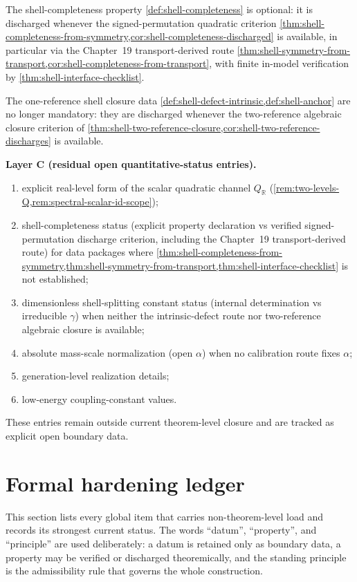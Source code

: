 The shell-completeness property \cref{def:shell-completeness} is optional:
it is discharged whenever the signed-permutation quadratic criterion
\cref{thm:shell-completeness-from-symmetry,cor:shell-completeness-discharged}
is available, in particular via the Chapter~19 transport-derived route
\cref{thm:shell-symmetry-from-transport,cor:shell-completeness-from-transport},
with finite in-model verification by
\cref{thm:shell-interface-checklist}.

The one-reference shell closure data
\cref{def:shell-defect-intrinsic,def:shell-anchor} are no longer mandatory:
they are discharged whenever the two-reference algebraic closure criterion
of \cref{thm:shell-two-reference-closure,cor:shell-two-reference-discharges}
is available.

\textbf{Layer C (residual open quantitative-status entries).}
\begin{enumerate}[label=\textup{(\roman*)}]
\item
  explicit real-level form of the scalar quadratic channel
  \(Q_{\mathbb R}\)
  (\cref{rem:two-levels-Q,rem:spectral-scalar-id-scope});
\item
  shell-completeness status (explicit property declaration vs verified
  signed-permutation discharge criterion, including the Chapter~19
  transport-derived route) for data packages where
  \cref{thm:shell-completeness-from-symmetry,thm:shell-symmetry-from-transport,thm:shell-interface-checklist}
  is not established;
\item
  dimensionless shell-splitting constant status
  (internal determination vs irreducible \(\gamma\)) when neither the
  intrinsic-defect route nor two-reference algebraic closure is available;
\item
  absolute mass-scale normalization (open \(\alpha\)) when no calibration
  route fixes \(\alpha\);
\item
  generation-level realization details;
\item
  low-energy coupling-constant values.
\end{enumerate}

These entries remain outside current theorem-level closure and are tracked as
explicit open boundary data.

\section{Formal hardening ledger}
\label{sec:cond-hardening-ledger}

This section lists every global item that carries non-theorem-level load and
records its strongest current status.
The words ``datum'', ``property'', and ``principle'' are used deliberately:
a datum is retained only as boundary data, a property may be verified or
discharged theoremically, and the standing principle is the admissibility rule
that governs the whole construction.


